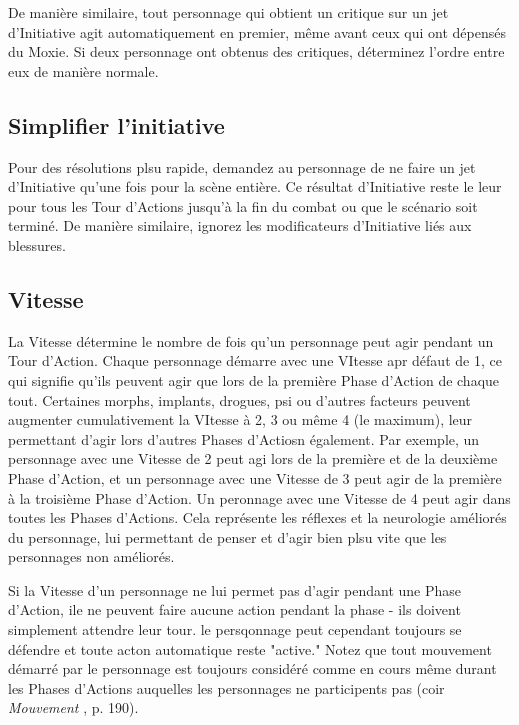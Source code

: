 De manière similaire, tout personnage qui obtient un critique sur un jet d'Initiative agit automatiquement en premier, même avant ceux qui ont dépensés du Moxie. Si deux personnage ont obtenus des critiques, déterminez l'ordre entre eux de manière normale. 

\subsection{Simplifier l'initiative} \label{sec:simplifying-init} 

Pour des résolutions plsu rapide, demandez au personnage de ne faire un jet d'Initiative qu'une fois pour la scène entière. Ce résultat d'Initiative reste le leur pour tous les Tour d'Actions jusqu'à la fin du combat ou que le scénario soit terminé. De manière similaire, ignorez les modificateurs d'Initiative liés aux blessures. 

\subsection{Vitesse} \label{sec:speed} 

La Vitesse détermine le nombre de fois qu'un personnage peut agir pendant un Tour d'Action. Chaque personnage démarre avec une VItesse apr défaut de 1, ce qui signifie qu'ils peuvent agir que lors de la première Phase d'Action de chaque tout. Certaines morphs, implants, drogues, psi ou d'autres facteurs peuvent augmenter cumulativement la VItesse à 2, 3 ou même 4 (le maximum), leur permettant d'agir lors d'autres Phases d'Actiosn également. Par exemple, un personnage avec une Vitesse de 2 peut agi lors de la première et de la deuxième Phase d'Action, et un personnage avec une Vitesse de 3 peut agir de la première à la troisième Phase d'Action. Un peronnage avec une Vitesse de 4 peut agir dans toutes les Phases d'Actions. Cela représente les réflexes et la neurologie améliorés du personnage, lui permettant de penser et d'agir bien plsu vite que les personnages non améliorés. 

Si la Vitesse d'un personnage ne lui permet pas d'agir pendant une Phase d'Action, ile ne peuvent faire aucune action pendant la phase - ils doivent simplement attendre leur tour. le persqonnage peut cependant toujours se défendre et toute acton automatique reste "active." Notez que tout mouvement démarré par le personnage est toujours considéré comme en cours même durant les Phases d'Actions auquelles les personnages ne participents pas (coir \emph{Mouvement }, p. 190). 

